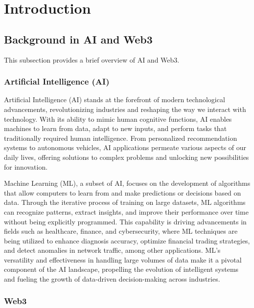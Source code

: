 \documentclass[conference]{IEEEtran}
\begin{document}


\section{Introduction}
\subsection{Background in AI and Web3}

This subsection provides a brief overview of AI and Web3.

\subsubsection{Artificial Intelligence (AI)} 


Artificial Intelligence (AI) stands at the forefront of modern technological advancements, revolutionizing industries and reshaping the way we interact with technology. With its ability to mimic human cognitive functions, AI enables machines to learn from data, adapt to new inputs, and perform tasks that traditionally required human intelligence. From personalized recommendation systems to autonomous vehicles, AI applications permeate various aspects of our daily lives, offering solutions to complex problems and unlocking new possibilities for innovation.


Machine Learning (ML), a subset of AI, focuses on the development of algorithms that allow computers to learn from and make predictions or decisions based on data. Through the iterative process of training on large datasets, ML algorithms can recognize patterns, extract insights, and improve their performance over time without being explicitly programmed. This capability is driving advancements in fields such as healthcare, finance, and cybersecurity, where ML techniques are being utilized to enhance diagnosis accuracy, optimize financial trading strategies, and detect anomalies in network traffic, among other applications. ML's versatility and effectiveness in handling large volumes of data make it a pivotal component of the AI landscape, propelling the evolution of intelligent systems and fueling the growth of data-driven decision-making across industries.

\subsubsection{Web3}
\end{document}
